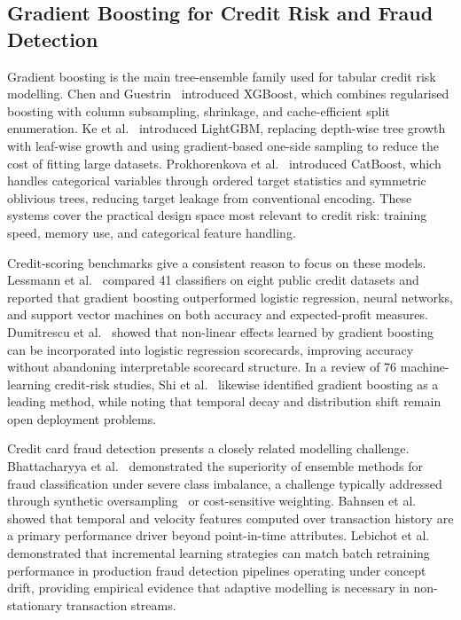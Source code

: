 \documentclass[pdflatex,sn-mathphys-num]{sn-jnl}
\theoremstyle{thmstyleone}
\theoremstyle{thmstyletwo}
\theoremstyle{thmstylethree}
\begin{document}
\subsection{Gradient Boosting for Credit Risk and Fraud Detection}
\label{sec:related:gb}

Gradient boosting is the main tree-ensemble family used for tabular credit
risk modelling. Chen and Guestrin~\cite{chen2016xgboost} introduced XGBoost,
which combines regularised boosting with column subsampling, shrinkage, and
cache-efficient split enumeration. Ke et al.~\cite{ke2017lightgbm} introduced
LightGBM, replacing depth-wise tree growth with leaf-wise growth and using
gradient-based one-side sampling to reduce the cost of fitting large datasets.
Prokhorenkova et al.~\cite{prokhorenkova2018catboost} introduced CatBoost,
which handles categorical variables through ordered target statistics and
symmetric oblivious trees, reducing target leakage from conventional encoding.
These systems cover the practical design space most relevant to credit risk:
training speed, memory use, and categorical feature handling.

Credit-scoring benchmarks give a consistent reason to focus on these models.
Lessmann et al.~\cite{lessmann2015credit} compared 41 classifiers on eight
public credit datasets and reported that gradient boosting outperformed
logistic regression, neural networks, and support vector machines on both
accuracy and expected-profit measures. Dumitrescu et
al.~\cite{dumitrescu2022credit} showed that non-linear effects learned by
gradient boosting can be incorporated into logistic regression scorecards,
improving accuracy without abandoning interpretable scorecard structure. In a
review of 76 machine-learning credit-risk studies, Shi et
al.~\cite{shi2022credit} likewise identified gradient boosting as a leading
method, while noting that temporal decay and distribution shift remain open
deployment problems.

Credit card fraud detection presents a closely related modelling challenge.
Bhattacharyya et al.~\cite{bhattacharyya2011fraud} demonstrated the superiority
of ensemble methods for fraud classification under severe class imbalance, a
challenge typically addressed through synthetic oversampling~\cite{chawla2002smote}
or cost-sensitive weighting. Bahnsen et al.~\cite{bahnsen2016feature} showed
that temporal and velocity features computed over transaction history are a
primary performance driver beyond point-in-time attributes. Lebichot et
al.~\cite{lebichot2021incremental} demonstrated that incremental learning
strategies can match batch retraining performance in production fraud detection
pipelines operating under concept drift, providing empirical evidence that
adaptive modelling is necessary in non-stationary transaction streams.
\end{document}
